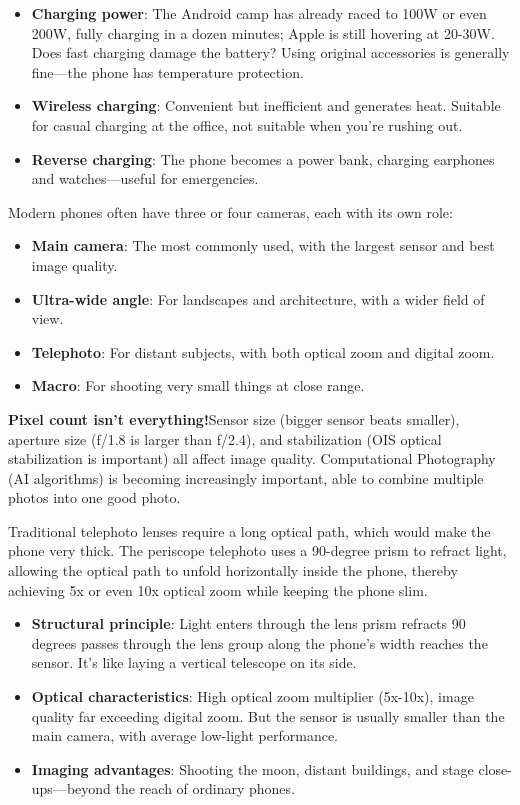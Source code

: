 \begin{itemize}
  \item \textbf{Charging power}: The Android camp has already raced to 100W or even 200W, fully charging in a dozen minutes; Apple is still hovering at 20-30W. Does fast charging damage the battery? Using original accessories is generally fine—the phone has temperature protection.
  \item \textbf{Wireless charging}: Convenient but inefficient and generates heat. Suitable for casual charging at the office, not suitable when you're rushing out.
  \item \textbf{Reverse charging}: The phone becomes a power bank, charging earphones and watches—useful for emergencies.
\end{itemize}


Modern phones often have three or four cameras, each with its own role:

\begin{itemize}
  \item \textbf{Main camera}: The most commonly used, with the largest sensor and best image quality.
  \item \textbf{Ultra-wide angle}: For landscapes and architecture, with a wider field of view.
  \item \textbf{Telephoto}: For distant subjects, with both optical zoom and digital zoom.
  \item \textbf{Macro}: For shooting very small things at close range.
\end{itemize}

\textbf{Pixel count isn't everything!}Sensor size (bigger sensor beats smaller), aperture size (f/1.8 is larger than f/2.4), and stabilization (OIS optical stabilization is important) all affect image quality. Computational Photography (AI algorithms) is becoming increasingly important, able to combine multiple photos into one good photo.


Traditional telephoto lenses require a long optical path, which would make the phone very thick. The periscope telephoto uses a 90-degree prism to refract light, allowing the optical path to unfold horizontally inside the phone, thereby achieving 5x or even 10x optical zoom while keeping the phone slim.

\begin{itemize}
  \item \textbf{Structural principle}: Light enters through the lens prism refracts 90 degrees passes through the lens group along the phone's width reaches the sensor. It's like laying a vertical telescope on its side.
  \item \textbf{Optical characteristics}: High optical zoom multiplier (5x-10x), image quality far exceeding digital zoom. But the sensor is usually smaller than the main camera, with average low-light performance.
  \item \textbf{Imaging advantages}: Shooting the moon, distant buildings, and stage close-ups—beyond the reach of ordinary phones.
\end{itemize}

